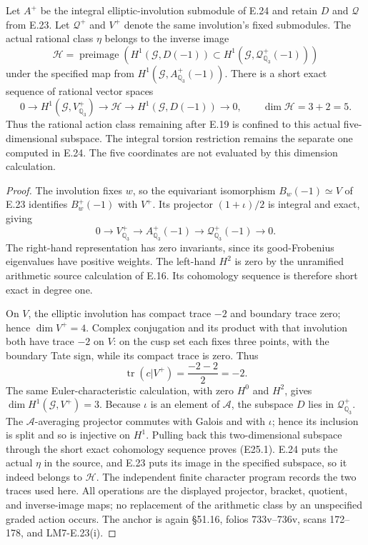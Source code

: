 \begin{corollary}
\label{E-five-parameters}
Let $A^+$ be the integral elliptic-involution submodule of
E.24 and retain $D$ and $\mathcal Q$ from E.23. Let
$\mathcal Q^+$ and $V^+$ denote the same involution's fixed
submodules. The actual rational class $\eta$ belongs to the
inverse image
\[
 \mathcal H=\operatorname{preimage}\left(
 H^1(\mathcal G,D(-1))\subset
 H^1(\mathcal G,\mathcal Q^+_{\mathbb Q_3}(-1))\right)
\]
under the specified map from
$H^1(\mathcal G,A^+_{\mathbb Q_3}(-1))$. There is a
short exact sequence of rational vector spaces
\[
 0\longrightarrow H^1(\mathcal G,V^+_{\mathbb Q_3})
   \longrightarrow\mathcal H
   \longrightarrow H^1(\mathcal G,D(-1))
   \longrightarrow0,
 \qquad \dim\mathcal H=3+2=5.
 \tag{E25.1}
\]
Thus the rational action class remaining after E.19 is
confined to this actual five-dimensional subspace. The
integral torsion restriction remains the separate one
computed in E.24. The five coordinates are not evaluated
by this dimension calculation.
\end{corollary}
\begin{proof}
The involution fixes $w$, so the equivariant isomorphism
$B_w(-1)\simeq V$ of E.23 identifies
$B_w^+(-1)$ with $V^+$. Its projector $(1+\iota)/2$ is
integral and exact, giving
\[
 0\longrightarrow V^+_{\mathbb Q_3}
   \longrightarrow A^+_{\mathbb Q_3}(-1)
   \longrightarrow\mathcal Q^+_{\mathbb Q_3}(-1)
   \longrightarrow0.
\]
The right-hand representation has zero invariants, since
its good-Frobenius eigenvalues have positive weights.
The left-hand $H^2$ is zero by the unramified arithmetic
source calculation of E.16. Its cohomology sequence is
therefore short exact in degree one.

On $V$, the elliptic involution has compact trace $-2$
and boundary trace zero; hence $\dim V^+=4$.
Complex conjugation and its product with that involution
both have trace $-2$ on $V$: on the cusp set each fixes
three points, with the boundary Tate sign, while its
compact trace is zero. Thus
\[
 \operatorname{tr}(c|V^+)=\frac{-2-2}{2}=-2.
\]
The same Euler-characteristic calculation, with zero
$H^0$ and $H^2$, gives $\dim H^1(\mathcal G,V^+)=3$.
Because $\iota$ is an element of $\mathcal A$, the
subspace $D$ lies in $\mathcal Q^+_{\mathbb Q_3}$.
The $\mathcal A$-averaging projector commutes with Galois
and with $\iota$; hence its inclusion is split and so
is injective on $H^1$. Pulling back this two-dimensional
subspace through the short exact cohomology sequence
proves (E25.1). E.24 puts the actual $\eta$ in the source,
and E.23 puts its image in the specified subspace, so it
indeed belongs to $\mathcal H$. The independent finite
character program records the two traces used here.
All operations are the displayed projector, bracket,
quotient, and inverse-image maps; no replacement of the
arithmetic class by an unspecified graded action occurs.
The anchor is again \S51.16, folios 733v--736v, scans
172--178, and LM7-E.23(i).
\end{proof}
